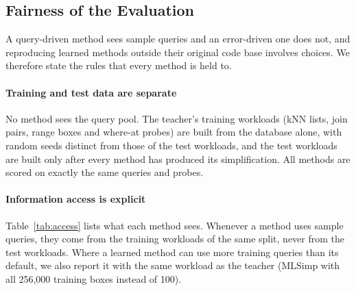 \documentclass[conference]{IEEEtran}
\begin{document}
\subsection{Fairness of the Evaluation}
\label{sec:fairness}

A query-driven method sees sample queries and an error-driven one does not, and reproducing
learned methods outside their original code base involves choices. We therefore state the rules
that every method is held to.

\paragraph{Training and test data are separate}
No method sees the query pool. The teacher's training workloads (kNN lists, join pairs, range boxes
and where-at probes) are built from the database alone, with random seeds distinct from those of
the test workloads, and the test workloads are built only after every method has produced its
simplification. All methods are scored on exactly the same queries and probes.

\paragraph{Information access is explicit}
Table~\ref{tab:access} lists what each method sees. Whenever a method uses sample queries, they
come from the training workloads of the same split, never from the test workloads. Where a learned
method can use more training queries than its default, we also report it with the same workload as
the teacher (MLSimp with all 256{,}000 training boxes instead of 100).
\end{document}
